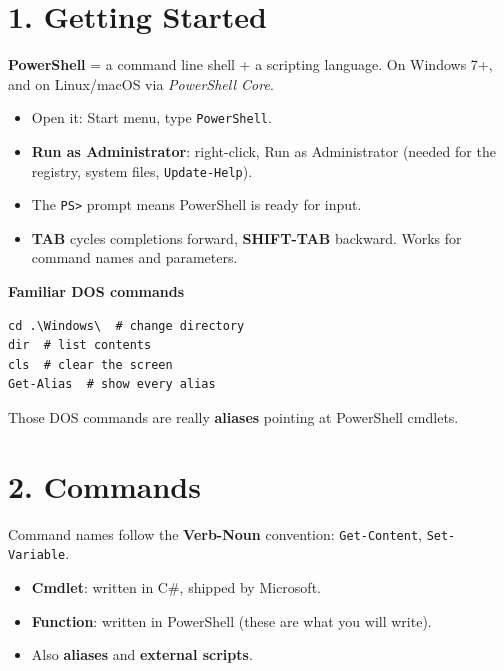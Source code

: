 \section{1. Getting Started}
\textbf{PowerShell} = a command line shell + a scripting language. On Windows 7+, and on Linux/macOS via \emph{PowerShell Core}.
\begin{itemize}
\item Open it: Start menu, type \texttt{PowerShell}.
\item \textbf{Run as Administrator}: right-click, Run as Administrator (needed for the registry, system files, \texttt{Update-Help}).
\item The \texttt{PS>} prompt means PowerShell is ready for input.
\item \textbf{TAB} cycles completions forward, \textbf{SHIFT-TAB} backward. Works for command names and parameters.
\end{itemize}

\textbf{Familiar DOS commands}

\begin{verbatim}
cd .\Windows\  # change directory
dir  # list contents
cls  # clear the screen
Get-Alias  # show every alias
\end{verbatim}
Those DOS commands are really \textbf{aliases} pointing at PowerShell cmdlets.

\section{2. Commands}
Command names follow the \textbf{Verb-Noun} convention: \texttt{Get-Content}, \texttt{Set-Variable}.
\begin{itemize}
\item \textbf{Cmdlet}: written in C\#, shipped by Microsoft.
\item \textbf{Function}: written in PowerShell (these are what you will write).
\item Also \textbf{aliases} and \textbf{external scripts}.
\end{itemize}

